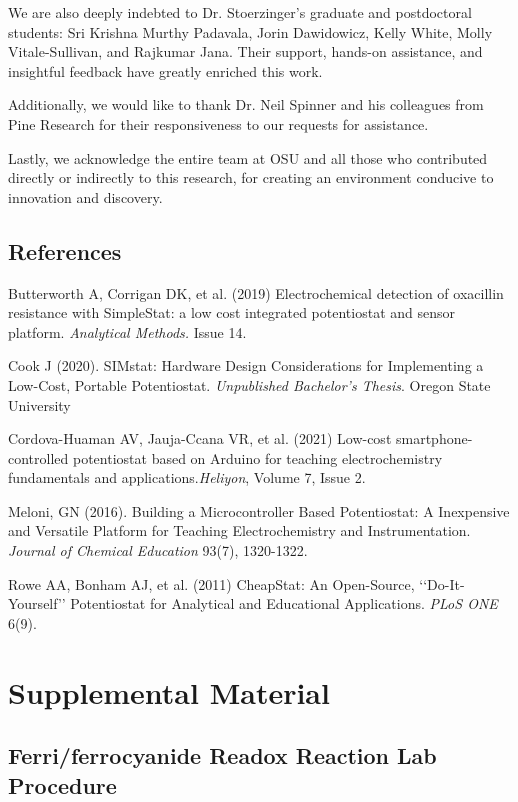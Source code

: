 \documentclass{article}
\begin{document}
We are also deeply indebted to Dr. Stoerzinger's graduate and postdoctoral students: Sri Krishna Murthy Padavala, Jorin Dawidowicz, Kelly White, Molly Vitale-Sullivan, and Rajkumar Jana. Their support, hands-on assistance, and insightful feedback have greatly enriched this work.

Additionally, we would like to thank Dr. Neil Spinner and his colleagues from Pine Research for their responsiveness to our requests for assistance. 

Lastly, we acknowledge the entire team at OSU and all those who contributed directly or indirectly to this research, for creating an environment conducive to innovation and discovery.

\newpage
\subsection*{References}
Butterworth A, Corrigan DK, et al. (2019) Electrochemical detection of oxacillin resistance with SimpleStat: a low cost integrated potentiostat and sensor platform. \emph{Analytical Methods.} Issue 14.


Cook J (2020). SIMstat: Hardware Design Considerations for Implementing a Low-Cost, Portable Potentiostat. \emph{Unpublished Bachelor's Thesis}. Oregon State University


Cordova-Huaman AV, Jauja-Ccana VR, et al. (2021) Low-cost smartphone-controlled potentiostat based on Arduino for teaching electrochemistry fundamentals and applications.\emph{Heliyon}, Volume 7, Issue 2.


Meloni, GN (2016). Building a Microcontroller Based Potentiostat: A Inexpensive and Versatile Platform for Teaching Electrochemistry and Instrumentation. \emph{Journal of Chemical Education} 93(7), 1320-1322.


Rowe AA, Bonham AJ, et al. (2011) CheapStat: An Open-Source, ‘‘Do-It-Yourself’’ Potentiostat for Analytical and Educational Applications. \emph{PLoS ONE} 6(9).


\newpage
\section*{Supplemental Material}
\subsection*{Ferri/ferrocyanide Readox Reaction Lab Procedure}
\end{document}
